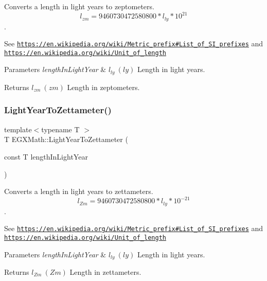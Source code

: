 Converts a length in light years to zeptometers. \[ l_{zm}=9460730472580800 * l_{ly} * 10^{21} \]. 

See \href{https://en.wikipedia.org/wiki/Metric_prefix#List_of_SI_prefixes}{\tt https\+://en.\+wikipedia.\+org/wiki/\+Metric\+\_\+prefix\#\+List\+\_\+of\+\_\+\+S\+I\+\_\+prefixes} and \href{https://en.wikipedia.org/wiki/Unit_of_length}{\tt https\+://en.\+wikipedia.\+org/wiki/\+Unit\+\_\+of\+\_\+length} 
\begin{DoxyParams}{Parameters}
{\em length\+In\+Light\+Year} & $ l_{ly}\ (ly)$ Length in light years. \\
\hline
\end{DoxyParams}
\begin{DoxyReturn}{Returns}
$ l_{zm}\ (zm)$ Length in zeptometers. 
\end{DoxyReturn}
\mbox{\label{group___e_g_x_math-_conversions-_length_conversions-_astronomical-_light_year-_s_i_gaa73b3b7d9806046fe0e8538c9e46a797}} 
\subsubsection{\texorpdfstring{Light\+Year\+To\+Zettameter()}{LightYearToZettameter()}}
{\footnotesize\ttfamily template$<$typename T $>$ \\
T E\+G\+X\+Math\+::\+Light\+Year\+To\+Zettameter (\begin{DoxyParamCaption}\item[{const T}]{length\+In\+Light\+Year }\end{DoxyParamCaption})}



Converts a length in light years to zettameters. \[ l_{Zm}=9460730472580800 * l_{ly} * 10^{-21} \]. 

See \href{https://en.wikipedia.org/wiki/Metric_prefix#List_of_SI_prefixes}{\tt https\+://en.\+wikipedia.\+org/wiki/\+Metric\+\_\+prefix\#\+List\+\_\+of\+\_\+\+S\+I\+\_\+prefixes} and \href{https://en.wikipedia.org/wiki/Unit_of_length}{\tt https\+://en.\+wikipedia.\+org/wiki/\+Unit\+\_\+of\+\_\+length} 
\begin{DoxyParams}{Parameters}
{\em length\+In\+Light\+Year} & $ l_{ly}\ (ly)$ Length in light years. \\
\hline
\end{DoxyParams}
\begin{DoxyReturn}{Returns}
$ l_{Zm}\ (Zm)$ Length in zettameters. 
\end{DoxyReturn}

